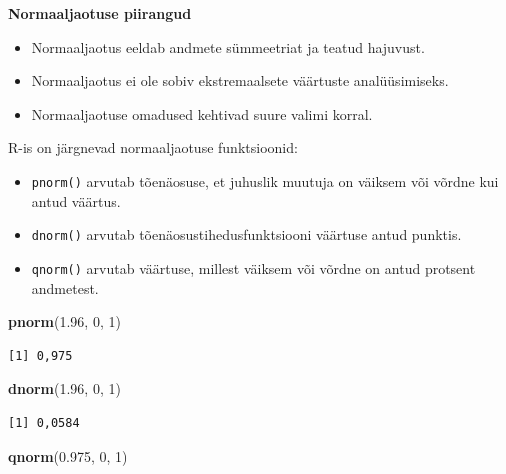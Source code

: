 \documentclass[
]{book}
\newenvironment{Shaded}{\begin{snugshade}}{\end{snugshade}}
\newcommand{\DecValTok}[1]{\textcolor[rgb]{0.00,0.00,0.81}{#1}}
\newcommand{\FloatTok}[1]{\textcolor[rgb]{0.00,0.00,0.81}{#1}}
\newcommand{\FunctionTok}[1]{\textcolor[rgb]{0.13,0.29,0.53}{\textbf{#1}}}
\newcommand{\NormalTok}[1]{#1}
\providecommand{\tightlist}{%
  \setlength{\itemsep}{0pt}\setlength{\parskip}{0pt}}
\renewenvironment{Shaded} {\begin{snugshade}\footnotesize} {\end{snugshade}}
\begin{document}
\textbf{Normaaljaotuse piirangud}

\begin{itemize}
\tightlist
\item
  Normaaljaotus eeldab andmete sümmeetriat ja teatud hajuvust.
\item
  Normaaljaotus ei ole sobiv ekstremaalsete väärtuste analüüsimiseks.
\item
  Normaaljaotuse omadused kehtivad suure valimi korral.
\end{itemize}

R-is on järgnevad normaaljaotuse funktsioonid:

\begin{itemize}
\tightlist
\item
  \texttt{pnorm()} arvutab tõenäosuse, et juhuslik muutuja on väiksem või võrdne kui antud väärtus.
\item
  \texttt{dnorm()} arvutab tõenäosustihedusfunktsiooni väärtuse antud punktis.
\item
  \texttt{qnorm()} arvutab väärtuse, millest väiksem või võrdne on antud protsent andmetest.
\end{itemize}

\begin{Shaded}
\begin{Highlighting}[]
\FunctionTok{pnorm}\NormalTok{(}\FloatTok{1.96}\NormalTok{, }\DecValTok{0}\NormalTok{, }\DecValTok{1}\NormalTok{) }
\end{Highlighting}
\end{Shaded}

\begin{verbatim}
[1] 0,975
\end{verbatim}

\begin{Shaded}
\begin{Highlighting}[]
\FunctionTok{dnorm}\NormalTok{(}\FloatTok{1.96}\NormalTok{, }\DecValTok{0}\NormalTok{, }\DecValTok{1}\NormalTok{) }
\end{Highlighting}
\end{Shaded}

\begin{verbatim}
[1] 0,0584
\end{verbatim}

\begin{Shaded}
\begin{Highlighting}[]
\FunctionTok{qnorm}\NormalTok{(}\FloatTok{0.975}\NormalTok{, }\DecValTok{0}\NormalTok{, }\DecValTok{1}\NormalTok{)}
\end{Highlighting}
\end{Shaded}
\end{document}
